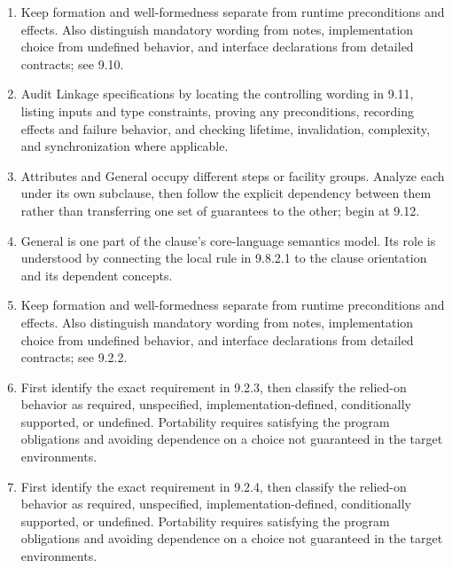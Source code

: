 \documentclass[11pt,letterpaper]{article}
\begin{document}
\begin{enumerate}
\item Keep formation and well-formedness separate from runtime preconditions and effects. Also distinguish mandatory wording from notes, implementation choice from undefined behavior, and interface declarations from detailed contracts; see 9.10.
\item Audit Linkage specifications by locating the controlling wording in 9.11, listing inputs and type constraints, proving any preconditions, recording effects and failure behavior, and checking lifetime, invalidation, complexity, and synchronization where applicable.
\item Attributes and General occupy different steps or facility groups. Analyze each under its own subclause, then follow the explicit dependency between them rather than transferring one set of guarantees to the other; begin at 9.12.
\item General is one part of the clause's core-language semantics model. Its role is understood by connecting the local rule in 9.8.2.1 to the clause orientation and its dependent concepts.
\item Keep formation and well-formedness separate from runtime preconditions and effects. Also distinguish mandatory wording from notes, implementation choice from undefined behavior, and interface declarations from detailed contracts; see 9.2.2.
\item First identify the exact requirement in 9.2.3, then classify the relied-on behavior as required, unspecified, implementation-defined, conditionally supported, or undefined. Portability requires satisfying the program obligations and avoiding dependence on a choice not guaranteed in the target environments.
\item First identify the exact requirement in 9.2.4, then classify the relied-on behavior as required, unspecified, implementation-defined, conditionally supported, or undefined. Portability requires satisfying the program obligations and avoiding dependence on a choice not guaranteed in the target environments.
\end{enumerate}
\end{document}
